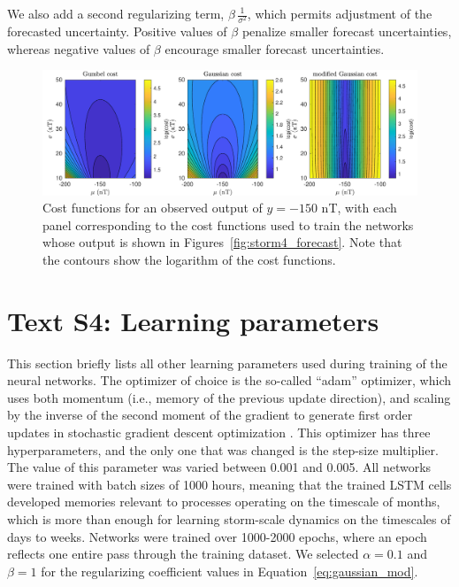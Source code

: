 \documentclass{agujournal2018}
\begin{document}
We also add a second regularizing term, $\beta\,\frac{1}{\sigma^2}$, which permits adjustment of the forecasted uncertainty. Positive values of $\beta$ penalize smaller forecast uncertainties, whereas negative values of $\beta$ encourage smaller forecast uncertainties.

\begin{figure}[htbp]
  \centering
  \includegraphics[width=1.0\textwidth]{figures/supplement/costs.pdf} 
  \caption{Cost functions for an observed output of $y=-150$ nT, with each panel corresponding to the cost functions used to train the networks whose output is shown in Figures~\ref{fig:storm4_forecast}. Note that the contours show the logarithm of the cost functions.}
  \label{fig:costs}
\end{figure}

\section*{Text S4: Learning parameters}

This section briefly lists all other learning parameters used during training of the neural networks. The optimizer of choice is the so-called ``adam'' optimizer, which uses both momentum (i.e., memory of the previous update direction), and scaling by the inverse of the second moment of the gradient to generate first order updates in stochastic gradient descent optimization \citep{Kingma2014adam}. This optimizer has three hyperparameters, and the only one that was changed is the step-size multiplier. The value of this parameter was varied between 0.001 and 0.005. All networks were trained with batch sizes of 1000 hours, meaning that the trained LSTM cells developed memories relevant to processes operating on the timescale of months, which is more than enough for learning storm-scale dynamics on the timescales of days to weeks. Networks were trained over 1000-2000 epochs, where an epoch reflects one entire pass through the training dataset. We selected $\alpha=0.1$ and $\beta=1$ for the regularizing coefficient values in Equation~\ref{eq:gaussian_mod}.
\end{document}
